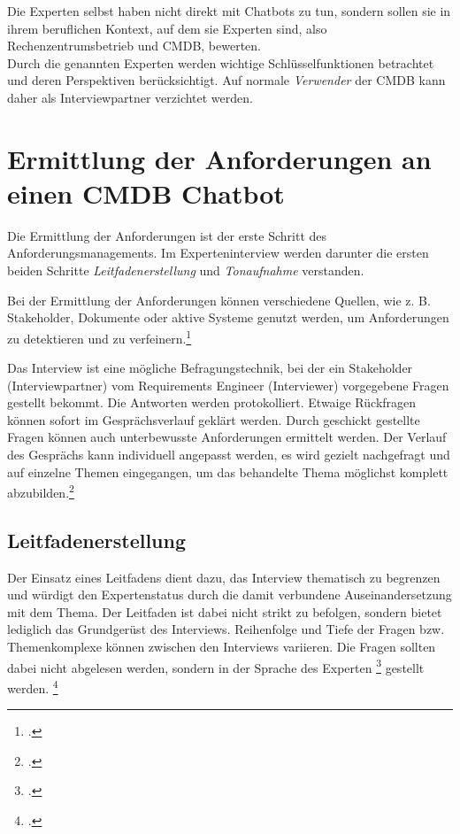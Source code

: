 Die Experten selbst haben nicht direkt mit Chatbots zu tun, sondern sollen sie in ihrem beruflichen Kontext, auf dem sie Experten sind, also Rechenzentrumsbetrieb und \acs{CMDB}, bewerten.\\
Durch die genannten Experten werden wichtige Schlüsselfunktionen betrachtet und deren Perspektiven berücksichtigt. Auf normale \textit{Verwender} der \acs{CMDB} kann daher als Interviewpartner verzichtet werden.


\section{Ermittlung der Anforderungen an einen CMDB Chatbot}
Die Ermittlung der Anforderungen ist der erste Schritt des Anforderungsmanagements. Im Experteninterview werden darunter die ersten beiden Schritte \textit{Leitfadenerstellung} und \textit{Tonaufnahme} verstanden.

Bei der Ermittlung der Anforderungen können verschiedene Quellen, wie z. B. Stakeholder, Dokumente oder aktive Systeme genutzt werden, um Anforderungen zu detektieren und zu verfeinern.\footcite[Vgl.][21]{Pohl_2015_Requirements}

Das Interview ist eine mögliche Befragungstechnik, bei der ein Stakeholder (Interviewpartner) vom Requirements Engineer (Interviewer) vorgegebene Fragen gestellt bekommt. Die Antworten werden protokolliert. Etwaige Rückfragen können sofort im Gesprächsverlauf geklärt werden. Durch geschickt gestellte Fragen können auch unterbewusste Anforderungen ermittelt werden. Der Verlauf des Gesprächs kann individuell angepasst werden, es wird gezielt nachgefragt und auf einzelne Themen eingegangen, um das behandelte Thema möglichst komplett abzubilden.\footcite[Vgl.][28]{Pohl_2015_Requirements}

\subsection{Leitfadenerstellung}
Der Einsatz eines Leitfadens dient dazu, das Interview thematisch zu begrenzen und würdigt den Expertenstatus durch die damit verbundene Auseinandersetzung mit dem Thema. Der Leitfaden ist dabei nicht strikt zu befolgen, sondern bietet lediglich das Grundgerüst des Interviews. Reihenfolge und Tiefe der Fragen bzw. Themenkomplexe können zwischen den Interviews variieren. Die Fragen sollten dabei nicht abgelesen werden, sondern in der \glqq{}Sprache des Experten\grqq
\footcite[][449]{Meuser_1991_Interview}
gestellt werden.
\footcite[Vgl.][448\psq]{Meuser_1991_Interview}

